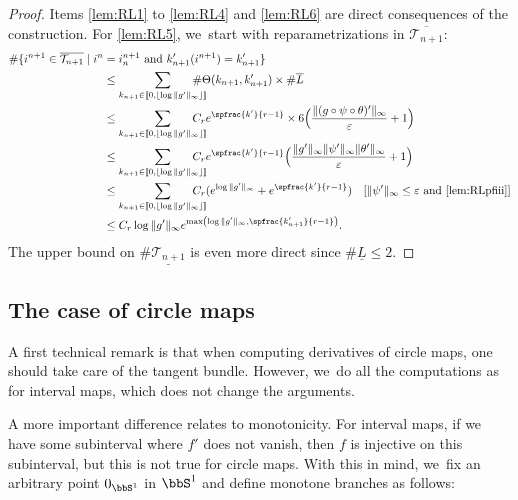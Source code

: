 \begin{proof}
Items \eqref{lem:RL1} to \eqref{lem:RL4} and \eqref{lem:RL6} are direct consequences of the construction. For \eqref{lem:RL5}, we~start with reparametrizations in $\overline{\mathcal{T}_{n+1}}$:
\begin{align*}
\# \{ i^{n+1} \in \overline{\mathcal{T}_{n+1}} \mid i^n &= i_n^{n+1} \text{ and } k_{n+1}'(i^{n+1}) = k_{n+1}' \}\\
&\leq \sum_{k_{n+1} \in [ \! [ 0, \lfloor \log \| g' \|_{\infty} \rfloor ]\!]} \hspace*{-5mm}\# \Theta(k_{n+1}, k'_{n+1}) \times \# \overline{L}\\
&\leq \sum_{k_{n+1} \in [ \! [ 0, \lfloor \log \| g' \|_{\infty} \rfloor ]\!]} \hspace*{-5mm}C_r e^{\spfrac{k'}{r-1}} \times 6 \Bigl (\frac{\| (g \circ \psi \circ \theta)' \|_{\infty}}{\varepsilon} + 1\Bigr)\\
&\leq \sum_{k_{n+1} \in [ \! [ 0, \lfloor \log \| g' \|_{\infty} \rfloor ]\!]} \hspace*{-5mm}C_r e^{\spfrac{k'}{r-1}} \Bigl (\frac{\| g' \|_{\infty} \| \psi' \|_{\infty} \| \theta' \|_{\infty}}{\varepsilon} + 1\Bigr)\\
&\leq \sum_{k_{n+1} \in [ \! [ 0, \lfloor \log \| g' \|_{\infty} \rfloor ]\!]} \hspace*{-5mm}C_r (e^{\log \| g' \|_{\infty}} + e^{\spfrac{k'}{r-1}})\quad[\| \psi' \|_{\infty} \leq \varepsilon \text{ and \eqref{lem:RLpfiii}}]\\
&\leq C_r \log \| g' \|_{\infty} e^{\max \left (\log \| g' \|_{\infty}, \spfrac{k_{n+1}'}{r-1} \right)}.
\end{align*}
The upper bound on $\# \underline{\mathcal{T}_{n+1}}$ is even more direct since $\# \underline{L} \leq 2$.
\end{proof}

\subsection{The case of circle maps}
\label{ssec:diff-int-cercle}

A first technical remark is that when computing derivatives of circle maps, one should take care of the tangent bundle.
However, we~do all the computations as for interval maps, which does not change the arguments.

A more important difference relates to monotonicity.
For interval maps, if we have some subinterval where $f'$ does not vanish, then $f$ is injective on this subinterval, but this is not true for circle maps.
With this in mind, we~fix an arbitrary point $0_{\bbS^1}$ in $\bbS^1$ and define monotone branches as follows:

